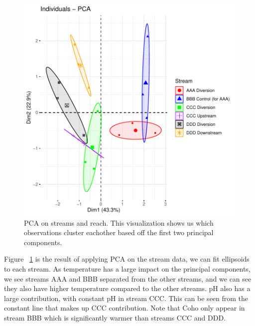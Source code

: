 \begin{figure}[H]
\includegraphics{Chapter5Images/streamPCA.pdf}
\caption{PCA on streams and reach. This visualization shows us which observations cluster eachother based off the first two principal components.}
\label{fig:pcastream}
\end{figure}

Figure ~\ref{fig:pcastream} is the result of applying PCA on the stream data, we can fit ellipsoids to each stream. As temperature has a large impact on the principal components, we see streams AAA and BBB separated from the other streams, and we can see they also have higher temperature compared to the other streams. pH also has a large contribution, with constant pH in stream CCC. This can be seen from the constant line that makes up CCC contribution. Note that Coho only appear in stream BBB which is significantly warmer than streams CCC and DDD.